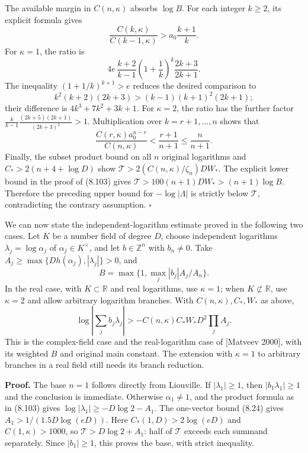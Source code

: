 \documentclass[
  11pt,
  a4paper,
]{article}
\begin{document}
The available margin in \(C(n,\kappa)\) absorbs \(\log B\). For each
integer \(k\ge2\), its explicit formula gives \[
\frac{C(k,\kappa)}{C(k-1,\kappa)}>
a_0\frac{k+1}{k}.
\] For \(\kappa=1\), the ratio is \[
4e\,\frac{k+2}{k-1}
\left(1+\frac1k\right)^k\frac{2k+3}{2k+1}.
\] The inequality \((1+1/k)^{k+1}>e\) reduces the desired comparison to
\[
k^2(k+2)(2k+3)>(k-1)(k+1)^2(2k+1);
\] their difference is \(4k^3+7k^2+3k+1\). For \(\kappa=2\), the ratio
has the further factor \(\frac{k}{k-1}\frac{(2k+5)(2k+1)}{(2k+3)^2}>1\).
Multiplication over \(k=r+1,\ldots,n\) shows that \[
\frac{C(r,\kappa)a_0^{n-r}}{C(n,\kappa)}
<\frac{r+1}{n+1}\le\frac n{n+1}.
\] Finally, the subset product bound on all \(n\) original logarithms
and \(C_*>2(n+4+\log D)\) show
\(\mathcal T>2(C(n,\kappa)/\zeta_n)DW_*\). The explicit lower bound in
the proof of (8.103) gives \(\mathcal T>100(n+1)DW_*>(n+1)\log B\).
Therefore the preceding upper bound for \(-\log|\Lambda|\) is strictly
below \(\mathcal T\), contradicting the contrary assumption. \(\square\)

We can now state the independent-logarithm estimate proved in the
following two cases. Let \(K\) be a number field of degree \(D\), choose
independent logarithms \(\lambda_j=\log\alpha_j\) of
\(\alpha_j\in K^\times\), and let \(b\in\mathbb Z^n\) with \(b_n\ne0\).
Take \(A_j\ge
\max\{Dh(\alpha_j),|\lambda_j|\}>0\), and \[
B=\max\{1,\max_j |b_j|A_j/A_n\}.
\] In the real case, with \(K\subset\mathbb R\) and real logarithms, use
\(\kappa=1\); when \(K\not\subset\mathbb R\), use \(\kappa=2\) and allow
arbitrary logarithm branches. With \(C(n,\kappa),C_*,W_*\) as above, \[
\log\left|\sum_jb_j\lambda_j\right|
>-C(n,\kappa)C_*W_*D^2\prod_jA_j.
\tag{8.130}
\] This is the complex-field case and the real-logarithm case of
{[}Matveev 2000{]}, with its weighted \(B\) and original main constant.
The extension with \(\kappa=1\) to arbitrary branches in a real field
still needs its branch reduction.

\textbf{Proof.} The base \(n=1\) follows directly from Liouville. If
\(|\lambda_1|\ge1\), then \(|b_1\lambda_1|\ge1\) and the conclusion is
immediate. Otherwise \(\alpha_1\ne1\), and the product formula as in
(8.103) gives \(\log|\lambda_1|\ge-D\log2-A_1\). The one-vector bound
(8.24) gives \(A_1>1/(1.5D\log(eD))\). Here \(C_*(1,D)>2\log(eD)\) and
\(C(1,\kappa)>1000\), so \(\mathcal T>D\log2+A_1\): half of
\(\mathcal T\) exceeds each summand separately. Since \(|b_1|\ge1\),
this proves the base, with strict inequality.
\end{document}
